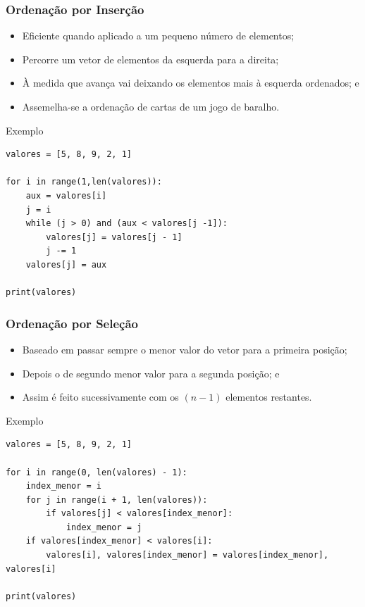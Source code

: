 \documentclass{beamer}
\begin{document}
\begin{frame}[fragile]
	\frametitle{Ordenação por Inserção}
	
	\begin{itemize}
		\item Eficiente quando aplicado a um pequeno número de elementos;
		\item Percorre um vetor de elementos da esquerda para a direita;
		\item À medida que avança vai deixando os elementos mais à esquerda
		ordenados; e
		\item Assemelha-se a ordenação de cartas de um jogo de baralho.
	\end{itemize}
	
	\begin{exampleblock}{Exemplo}
		\begin{lstlisting}
valores = [5, 8, 9, 2, 1]

for i in range(1,len(valores)):
    aux = valores[i]
    j = i
    while (j > 0) and (aux < valores[j -1]):
        valores[j] = valores[j - 1] 
        j -= 1
    valores[j] = aux

print(valores)
		\end{lstlisting}
	\end{exampleblock}
\end{frame}

\begin{frame}[fragile]
\frametitle{Ordenação por Seleção}

\begin{itemize}
	\item Baseado em passar sempre o menor valor do vetor para a primeira posição;
	\item Depois o de segundo menor valor para a segunda posição; e
	\item Assim é feito sucessivamente com os $(n - 1)$ elementos restantes.
\end{itemize}

\begin{exampleblock}{Exemplo}
	\begin{lstlisting}
valores = [5, 8, 9, 2, 1]

for i in range(0, len(valores) - 1):
    index_menor = i
    for j in range(i + 1, len(valores)):
        if valores[j] < valores[index_menor]:
            index_menor = j
    if valores[index_menor] < valores[i]:
        valores[i], valores[index_menor] = valores[index_menor], valores[i]  

print(valores)
	\end{lstlisting}
\end{exampleblock}
\end{frame}
\end{document}
